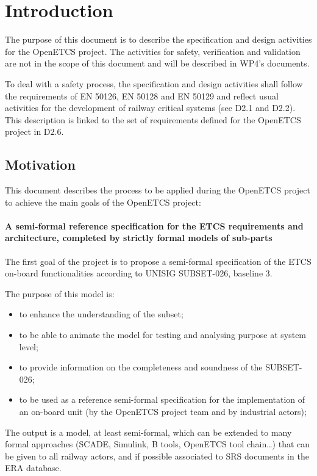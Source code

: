 \section{Introduction}

The purpose of this document is to describe the specification and design activities for the OpenETCS project. The activities for safety, verification and validation are not in the scope of this document and will be described in WP4's documents.

To deal with a safety process, the specification and design activities shall follow the requirements of EN 50126, EN 50128 and EN 50129 and reflect usual activities for the development of railway critical systems (see D2.1  and D2.2).
This description is linked to the set of requirements defined for the OpenETCS project in D2.6.

\subsection{Motivation}

This document describes the process to  be applied  during the OpenETCS project to achieve the main goals of the OpenETCS project:

\paragraph{A semi-formal reference specification for the ETCS requirements and architecture, completed by strictly formal  models of sub-parts}
The first goal of the project is to propose a semi-formal specification of the ETCS on-board functionalities according to  UNISIG SUBSET-026, baseline 3.

The purpose of this model is:
\begin{itemize}
\item to enhance the understanding of the subset;
\item to be able to animate the model for testing and analysing purpose at system level;
\item to provide information on the completeness and soundness of the SUBSET-026;
\item to be used as a reference semi-formal specification for the implementation of an on-board unit
(by the OpenETCS project team and by industrial actors);
\end{itemize}

The output is a model, at least semi-formal, which can be extended to many formal approaches (SCADE,
Simulink, B tools, OpenETCS tool chain…) that can be given to all railway actors, and
if possible associated to SRS documents in the ERA database.

